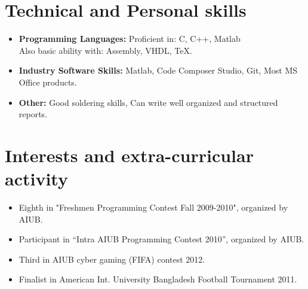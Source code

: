 \documentclass[11pt,a4paper,sans]{moderncv}        %
\begin{document}
\section{Technical and Personal skills}

\vspace{2pt}

\begin{itemize}

\item \textbf{Programming Languages:} Proficient in: C, C++, Matlab \\ Also basic ability with: Assembly, VHDL, TeX.

\vspace{2pt}

\item \textbf{Industry Software Skills:} Matlab, Code Composer Studio, Git, Most MS Office products.

\vspace{2pt}



\item \textbf{Other:} Good soldering skills, Can write well organized and structured reports.

\end{itemize}

\section{Interests and extra-curricular activity}

\vspace{2pt}

\begin{itemize}

\item{Eighth in "Freshmen Programming Contest Fall 2009-2010", organized by AIUB.}


\item{Participant in “Intra AIUB Programming Contest 2010”, organized by AIUB.}


\item{Third in AIUB cyber gaming (FIFA) contest 2012.}


\item{Finalist in American Int. University Bangladesh Football Tournament 2011.}

\end{itemize}
\end{document}
